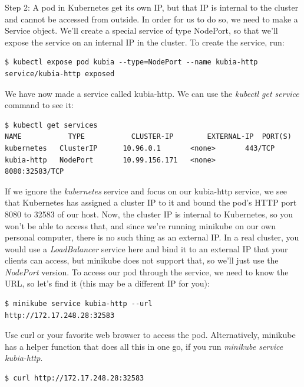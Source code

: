 \documentclass[a4paper,10pt]{article}
\begin{document}
Step 2: A pod in Kubernetes get its own IP, but that IP is internal to the cluster and cannot be accessed from outside. In order for us to do so, we need to make a Service object. We'll create a special service of type NodePort, so that we'll expose the service on an internal IP in the cluster. To create the service, run:

\begin{lstlisting}[numbers=none, basicstyle=\ttfamily]
$ kubectl expose pod kubia --type=NodePort --name kubia-http
service/kubia-http exposed
\end{lstlisting}

We have now made a service called kubia-http. We can use the \textit{kubectl get service} command to see it:

\begin{lstlisting}[numbers=none, basicstyle=\ttfamily]
$ kubectl get services
NAME	       TYPE	          CLUSTER-IP	    EXTERNAL-IP	 PORT(S)
kubernetes   ClusterIP      10.96.0.1       <none>       443/TCP
kubia-http   NodePort       10.99.156.171   <none>       8080:32583/TCP
\end{lstlisting}

If we ignore the \textit{kubernetes} service and focus on our kubia-http service, we see that Kubernetes has assigned a cluster IP to it and bound the pod's HTTP port 8080 to 32583 of our host. Now, the cluster IP is internal to Kubernetes, so you won't be able to access that, and since we're running minikube on our own personal computer, there is no such thing as an external IP. In a real cluster, you would use a \textit{LoadBalancer} service here and bind it to an external IP that your clients can access, but minikube does not support that, so we'll just use the \textit{NodePort} version. To access our pod through the service, we need to know the URL, so let's find it (this may be a different IP for you):

\begin{lstlisting}[numbers=none, basicstyle=\ttfamily]
$ minikube service kubia-http --url
http://172.17.248.28:32583
\end{lstlisting}

Use curl or your favorite web browser to access the pod. Alternatively, minikube has a helper function that does all this in one go, if you run \textit{minikube service kubia-http}.

\begin{lstlisting}[numbers=none, basicstyle=\ttfamily]
$ curl http://172.17.248.28:32583
\end{lstlisting}
\end{document}
